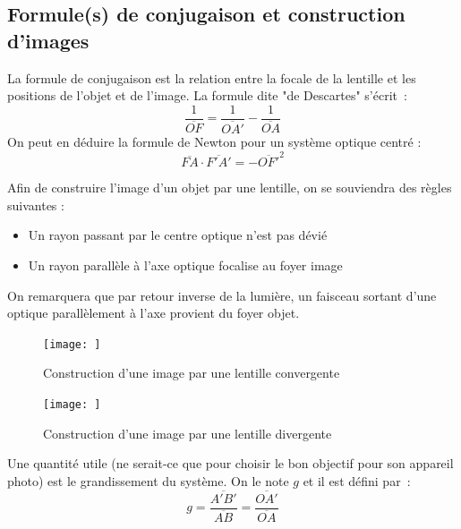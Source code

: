 \documentclass[a4paper]{book}
\begin{document}
\subsection{Formule(s) de conjugaison et construction d'images}

La formule de conjugaison est la relation entre la focale de la lentille et les positions de l'objet et de l'image. La formule dite "de Descartes" s'écrit~:
\begin{equation}
\label{eq:descartes}
\frac{1}{\overline{OF}}=\frac{1}{\overline{OA'}}-\frac{1}{\overline{OA}}
\end{equation}
On peut en déduire la formule de Newton pour un système optique centré : 
\begin{equation}
\label{eq:newton}
\overline{FA}\cdot\overline{F'A'}=-\overline{OF'}^2
\end{equation}

Afin de construire l'image d'un objet par une lentille, on se souviendra des règles suivantes : 
\begin{itemize}
    \item Un rayon passant par le centre optique n'est pas dévié
    \item Un rayon parallèle à l'axe optique focalise au foyer image
\end{itemize}
On remarquera que par retour inverse de la lumière, un faisceau sortant d'une optique parallèlement à l'axe provient du foyer objet.

\begin{figure}[!htbp]
\label{fig:image_lentille_convergente}
\begin{center}
\texttt{[image: ]}
\end{center}
\caption{Construction d'une image par une lentille convergente}
\end{figure}

\begin{figure}[!htbp]
\label{fig:image_lentille_divergente}
\begin{center}
\texttt{[image: ]}
\end{center}
\caption{Construction d'une image par une lentille divergente}
\end{figure}

Une quantité utile (ne serait-ce que pour choisir le bon objectif pour son appareil photo) est le grandissement du système. On le note $g$ et il est défini par~:
\begin{equation}
\label{eq:grandissement}
g=\frac{\overline{A'B'}}{\overline{AB}}=\frac{\overline{OA'}}{\overline{OA}}
\end{equation}
\end{document}
